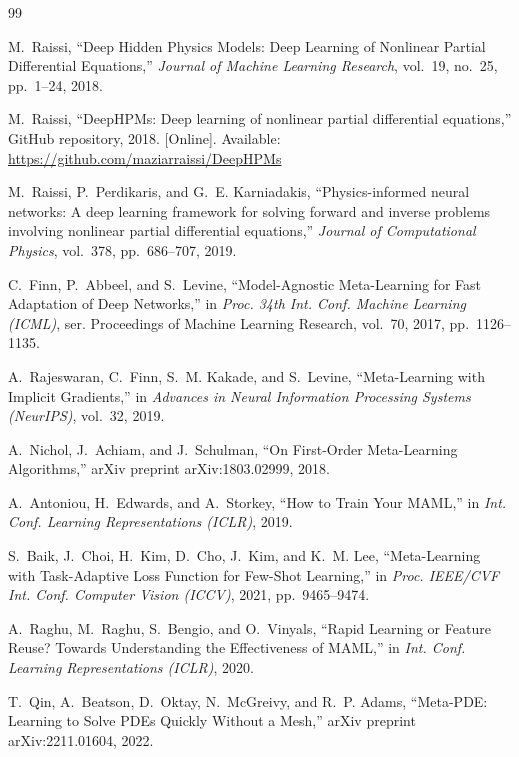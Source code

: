 \documentclass[10pt,journal,compsoc]{IEEEtran}
\begin{document}
\newpage
\begin{thebibliography}{99}


M.~Raissi, ``Deep Hidden Physics Models: Deep Learning of Nonlinear Partial
Differential Equations,'' \emph{Journal of Machine Learning Research},
vol.~19, no.~25, pp.~1--24, 2018.

M.~Raissi, ``DeepHPMs: Deep learning of nonlinear partial differential
equations,'' GitHub repository, 2018. [Online]. Available:
\url{https://github.com/maziarraissi/DeepHPMs}

M.~Raissi, P.~Perdikaris, and G.~E. Karniadakis, ``Physics-informed neural
networks: A deep learning framework for solving forward and inverse problems
involving nonlinear partial differential equations,''
\emph{Journal of Computational Physics}, vol.~378, pp.~686--707, 2019.

C.~Finn, P.~Abbeel, and S.~Levine, ``Model-Agnostic Meta-Learning for Fast
Adaptation of Deep Networks,'' in \emph{Proc. 34th Int. Conf. Machine
Learning (ICML)}, ser. Proceedings of Machine Learning Research, vol.~70,
2017, pp.~1126--1135.

A.~Rajeswaran, C.~Finn, S.~M. Kakade, and S.~Levine, ``Meta-Learning with
Implicit Gradients,'' in \emph{Advances in Neural Information Processing
Systems (NeurIPS)}, vol.~32, 2019.


A.~Nichol, J.~Achiam, and J.~Schulman, ``On First-Order Meta-Learning
Algorithms,'' arXiv preprint arXiv:1803.02999, 2018.

A.~Antoniou, H.~Edwards, and A.~Storkey, ``How to Train Your MAML,'' in
\emph{Int. Conf. Learning Representations (ICLR)}, 2019.

S.~Baik, J.~Choi, H.~Kim, D.~Cho, J.~Kim, and K.~M. Lee, ``Meta-Learning with
Task-Adaptive Loss Function for Few-Shot Learning,'' in \emph{Proc.
IEEE/CVF Int. Conf. Computer Vision (ICCV)}, 2021, pp.~9465--9474.

A.~Raghu, M.~Raghu, S.~Bengio, and O.~Vinyals, ``Rapid Learning or Feature
Reuse? Towards Understanding the Effectiveness of MAML,'' in \emph{Int.
Conf. Learning Representations (ICLR)}, 2020.

T.~Qin, A.~Beatson, D.~Oktay, N.~McGreivy, and R.~P. Adams, ``Meta-PDE:
Learning to Solve PDEs Quickly Without a Mesh,'' arXiv preprint
arXiv:2211.01604, 2022.


\end{thebibliography}
\end{document}
